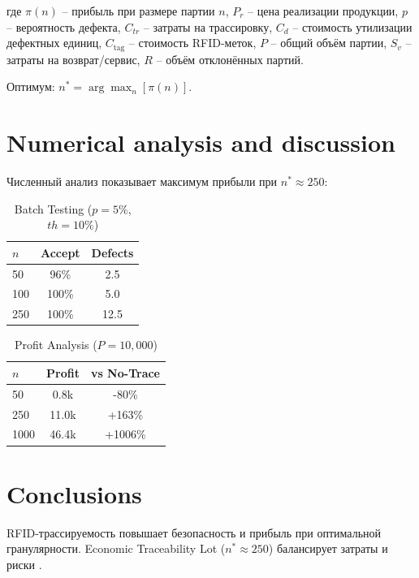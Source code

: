 \documentclass[fleqn,10pt,russian]{olplainarticle-class}
\begin{document}
где $\pi(n)$ -- прибыль при размере партии $n$, 
$P_r$ -- цена реализации продукции, 
$p$ -- вероятность дефекта, 
$C_{tr}$ -- затраты на трассировку, 
$C_d$ -- стоимость утилизации дефектных единиц, 
$C_{\text{tag}}$ -- стоимость RFID-меток, 
$P$ -- общий объём партии, 
$S_v$ -- затраты на возврат/сервис, 
$R$ -- объём отклонённых партий. 

Оптимум: $n^*=\arg\max_n[\pi(n)]$.

\section*{Numerical analysis and discussion}

Численный анализ показывает максимум прибыли при $n^*\approx250$:

\begin{table}[h]
\centering
\caption{Batch Testing ($p=5\%$, $th=10\%$)}
\begin{tabular}{|l|c|c|}
\hline
$n$ & Accept & Defects \\
\hline
50 & 96\% & 2.5 \\
100 & 100\% & 5.0 \\
250 & 100\% & 12.5 \\
\hline
\end{tabular}
\label{tab:batches}
\end{table}

\begin{table}[h]
\centering
\caption{Profit Analysis ($P=10{,}000$)}
\begin{tabular}{|l|c|c|}
\hline
$n$ & Profit & vs No-Trace \\
\hline
50 & 0.8k & -80\% \\
250 & 11.0k & +163\% \\
1000 & 46.4k & +1006\% \\
\hline
\end{tabular}
\label{tab:profit}
\end{table}

\section*{Conclusions}

RFID-трассируемость повышает безопасность и прибыль при оптимальной гранулярности. Economic Traceability Lot ($n^*\approx250$) балансирует затраты и риски \cite{BartkovaJouvet1999}.

\nocite{*}

\end{document}
